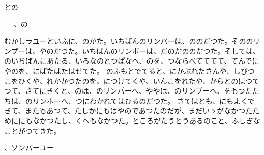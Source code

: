 \documentclass[a4paper,
tate,
book]
{jlreq}
\begin{document}
との
 
 
            、の

  むかしラユーといふに、のがた。いちばんのリンパーは、ののだつた。そののリンプーは、やのだつた。いちばんのリンポーは、だのだののだつた。そしては、のいちばんにあたる、いろなのとつぱなへ、のを、つならべてててて、てんでにやのを、にぱたぱたはせてた。
  のふもとでてると、にかぶれたさんや、しびつこをひくや、れかかつたのを、につけてくや、いんこをれたや、からとのぼつてつて、さてにきくと、のは、のリンパーへ、ややは、のリンプーへ、をもつたたちは、のリンポーへ、つにわかれてはひるのだつた。
  さてはとも、にもよくできて、またもあつて、たしかにもはやのであつたのだが、まだいゝがなかつたためににもなかつたし、くへもなかつた。ところがたうとうあるのこと、ふしぎなことがつてきた。

            、ソンバーユー
\end{document}
